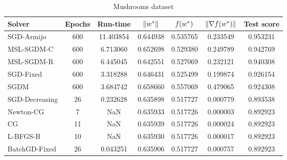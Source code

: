 \begin{table}
\caption{Mushrooms dataset}
\label{tab:mush-tab}
\centering
\begin{tabular}{lS[drop-zero-decimal]S[round-precision=4]S[round-precision=6]S[round-precision=6]S[exponent-mode=scientific]S[round-precision=6]}
\toprule
Solver & {Epochs} & {Run-time} & {$\lVert w^\ast\rVert$} & {$\operatorname*{\mathit{f}}(w^\ast)$} & {$\lVert\nabla f(w^\ast)\rVert$} & {Test score} \\
\midrule
SGD-Armijo & 600 & 11.403854 & 0.644938 & 0.535765 & 0.233549 & 0.953231 \\
MSL-SGDM-C & 600 & 6.713060 & 0.652698 & 0.529380 & 0.249789 & 0.942769 \\
MSL-SGDM-R & 600 & 6.445045 & 0.642551 & 0.527069 & 0.232121 & 0.940308 \\
SGD-Fixed & 600 & 3.318288 & 0.646431 & 0.525499 & 0.199874 & 0.926154 \\
SGDM & 600 & 3.684742 & 0.658660 & 0.557069 & 0.479065 & 0.924308 \\
SGD-Decreasing & 26 & 0.232628 & 0.635898 & 0.517727 & 0.000779 & 0.893538 \\
Newton-CG & 7 & NaN & 0.635933 & 0.517726 & 0.000003 & 0.892923 \\
CG & 11 & NaN & 0.635939 & 0.517726 & 0.000024 & 0.892923 \\
L-BFGS-B & 10 & NaN & 0.635930 & 0.517726 & 0.000017 & 0.892923 \\
BatchGD-Fixed & 26 & 0.043251 & 0.635906 & 0.517727 & 0.000757 & 0.892923 \\
\bottomrule
\end{tabular}
\end{table}

